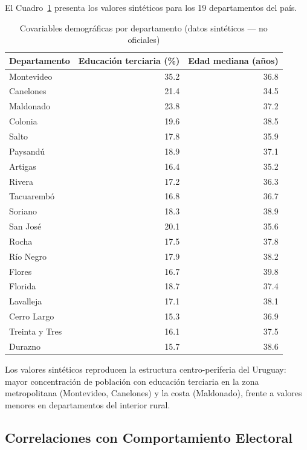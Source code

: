 El Cuadro~\ref{tab:census_data} presenta los valores sintéticos para los 19 departamentos del país.

\begin{table}[H]
\centering
\caption{Covariables demográficas por departamento (datos sintéticos --- no oficiales)}
\label{tab:census_data}
\begin{tabular}{lrr}
\toprule
\textbf{Departamento} & \textbf{Educación terciaria (\%)} & \textbf{Edad mediana (años)} \\
\midrule
Montevideo           & 35.2 & 36.8 \\
Canelones            & 21.4 & 34.5 \\
Maldonado            & 23.8 & 37.2 \\
Colonia              & 19.6 & 38.5 \\
Salto                & 17.8 & 35.9 \\
Paysandú             & 18.9 & 37.1 \\
Artigas              & 16.4 & 35.2 \\
Rivera               & 17.2 & 36.3 \\
Tacuarembó           & 16.8 & 36.7 \\
Soriano              & 18.3 & 38.9 \\
San José             & 20.1 & 35.6 \\
Rocha                & 17.5 & 37.8 \\
Río Negro            & 17.9 & 38.2 \\
Flores               & 16.7 & 39.8 \\
Florida              & 18.7 & 37.4 \\
Lavalleja            & 17.1 & 38.1 \\
Cerro Largo          & 15.3 & 36.9 \\
Treinta y Tres       & 16.1 & 37.5 \\
Durazno              & 15.7 & 38.6 \\
\bottomrule
\end{tabular}
\end{table}

Los valores sintéticos reproducen la estructura centro-periferia del Uruguay: mayor concentración de población con educación terciaria en la zona metropolitana (Montevideo, Canelones) y la costa (Maldonado), frente a valores menores en departamentos del interior rural.

\subsection{Correlaciones con Comportamiento Electoral}
\label{subsec:census_correlations}

